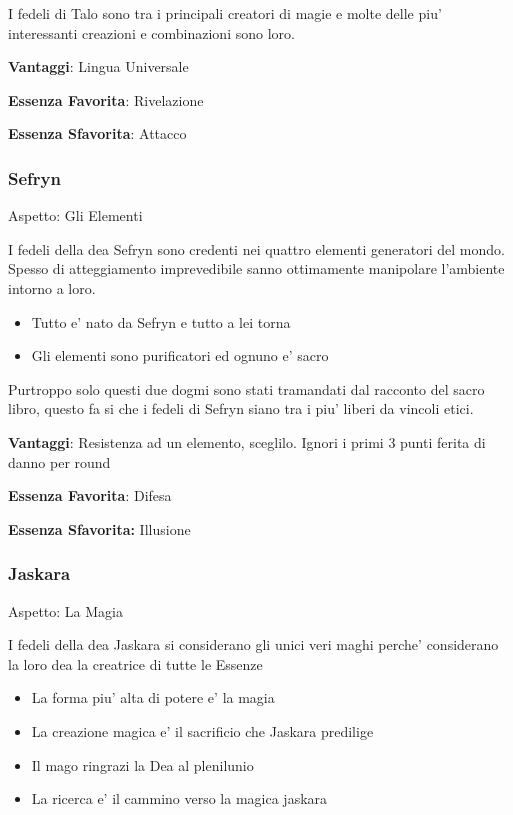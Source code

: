 \documentclass[a4paper,11pt,twoside,openany]{book}
\begin{document}
I fedeli di Talo sono tra i principali creatori di magie e molte delle piu' interessanti creazioni e combinazioni sono loro.


\textbf{Vantaggi}: Lingua Universale

\textbf{Essenza Favorita}: Rivelazione

\textbf{Essenza Sfavorita}: Attacco
\bigskip


\subsubsection{Sefryn}

Aspetto: Gli Elementi
\bigskip


I fedeli della dea Sefryn sono credenti nei quattro elementi generatori del mondo. Spesso di atteggiamento imprevedibile sanno ottimamente manipolare l'ambiente intorno a loro.


\begin{itemize}
	\item Tutto e' nato da Sefryn e tutto a lei torna
	\item Gli elementi sono purificatori ed ognuno e' sacro
\end{itemize}

Purtroppo solo questi due dogmi sono stati tramandati dal racconto del sacro libro, questo fa si che i fedeli di Sefryn siano tra i piu' liberi da vincoli etici.


\textbf{Vantaggi}: Resistenza ad un elemento, sceglilo. Ignori i primi 3 punti ferita di danno per round

\textbf{Essenza Favorita}: Difesa

\textbf{Essenza Sfavorita:} Illusione

\bigskip

\subsubsection{Jaskara}

Aspetto: La Magia
\bigskip


I fedeli della dea Jaskara si considerano gli unici veri maghi perche' considerano la loro dea la creatrice di tutte le Essenze

\begin{itemize}
	\item La forma piu' alta di potere e' la magia
	\item La creazione magica e' il sacrificio che Jaskara predilige
	\item Il mago ringrazi la Dea al plenilunio 
	\item La ricerca e' il cammino verso la magica jaskara
\end{itemize}
\end{document}
